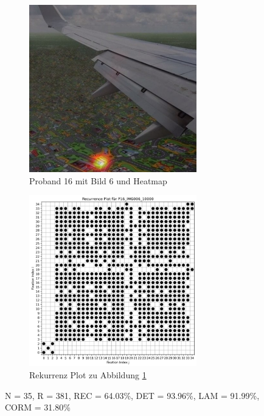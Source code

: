 \documentclass[
    language=german, %
    thesis=seminar, %
    supervisor=postdoc, %
    multiauthor=true, %
    ]{settings/csssa-thesis}
\begin{document}
\begin{figure}[ht]
    \centering
    \begin{subfigure}{0.49\textwidth}
        \centering
        \includegraphics[width=0.8\textwidth]{figures/Bild16.jpg}
        \caption{Proband 16 mit Bild 6 und Heatmap}\label{fig:Bild14a}
    \end{subfigure}
    \begin{subfigure}{0.49\textwidth}
        \centering
        \includegraphics[width=0.8\textwidth]{figures/Bild17.png}
        \caption{Rekurrenz Plot zu Abbildung \ref{fig:Bild14a}}\label{fig:Bild14b}
    \end{subfigure}\label{fig:Bild14}
    \caption{N = 35, R = 381, REC = 64.03\%, DET = 93.96\%, LAM = 91.99\%, CORM = 31.80\%}
\end{figure}
\end{document}
